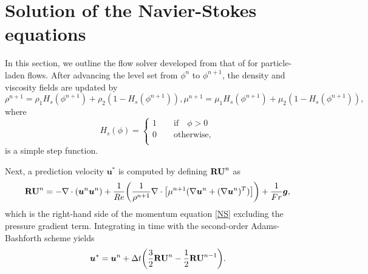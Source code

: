 

\section{Solution of the Navier-Stokes equations}
\label{subsec: NS}


In this section, we outline the flow solver developed from that of \cite{Wim-Paul_JCP_2012} for particle-laden flows. After advancing the level set from $\phi^{n}$ to $\phi^{n+1}$, the density and viscosity fields are updated by
\begin{subequations}
 \begin{equation}
  \rho^{n+1} = \rho_1 H_s(\phi^{n+1}) + \rho_2 (1-H_s(\phi^{n+1})), 
 \end{equation}
 \begin{equation}
  \mu^{n+1} = \mu_1 H_s(\phi^{n+1}) + \mu_2 (1-H_s(\phi^{n+1})), 
  \label{visc profile}
 \end{equation}
\end{subequations}
\noindent where
\begin{equation}
    H_s(\phi)=
    \begin{cases}
        1 \quad \quad \textrm{if} \quad \phi > 0 \\
        0 \quad \quad \textrm{otherwise}, \\
    \end{cases}
\end{equation}
\noindent is a simple step function.

Next, a prediction velocity ${\bm u}^*$ is computed by defining ${\bf RU}^n$ as
\begin{equation}
  {\bf RU}^n = -\nabla \cdot ({\bm u}^n {\bm u}^n)+\frac{1}{Re}\bigg(\frac{1}{\rho^{n+1}} \nabla \cdot \big[\mu^{n+1}(\nabla {\bm u}^n+(\nabla {\bm u}^n)^T)\big]\bigg)+\frac{1}{Fr}{\bm g},
  \label{ru}
\end{equation}
\noindent which is the right-hand side of the momentum equation \eqref{NS} excluding the pressure gradient term. Integrating in time with the second-order Adams-Bashforth scheme  yields
\begin{equation}
    {\bm u}^* ={\bm u}^n +\Delta t \bigg(\frac{3}{2} {\bf RU}^n-\frac{1}{2} {\bf RU}^{n-1} \bigg).
  \label{ab2}
\end{equation}

